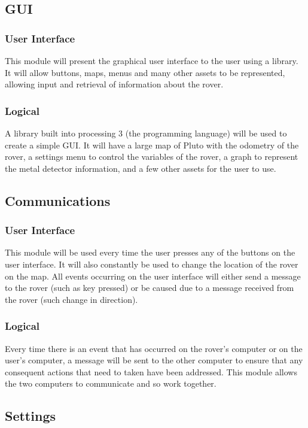 \documentclass[11pt]{report}
\begin{document}
\subsection{GUI}
\subsubsection{\normalfont User Interface}
This module will present the graphical user interface to the user using a library. It will allow buttons, maps, menus and many other assets to be represented, allowing input and retrieval of information about the rover.
\subsubsection{\normalfont Logical}
A library built into processing 3 (the programming language) will be used to create a simple GUI. It will have a large map of Pluto with the odometry of the rover, a settings menu to control the variables of the rover, a graph to represent the metal detector information, and a few other assets for the user to use.

\subsection{Communications}
\subsubsection{\normalfont User Interface}
This module will be used every time the user presses any of the buttons on the user interface. It will also constantly be used to change the location of the rover on the map. All events occurring on the user interface will either send a message to the rover (such as key pressed) or be caused due to a message received from the rover (such change in direction).
\subsubsection{\normalfont Logical}
Every time there is an event that has occurred on the rover's computer or on the user's computer, a message will be sent to the other computer to ensure that any consequent actions that need to taken have been addressed. This module allows the two computers to communicate and so work together.

\subsection{Settings}
\end{document}
